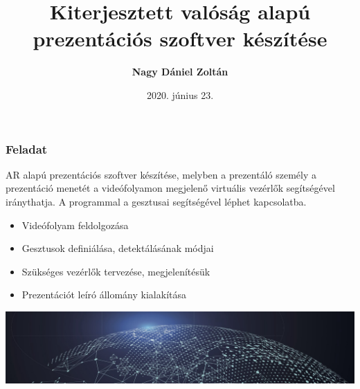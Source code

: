 \documentclass{beamer}
\title[Szakdolgozat]{\Huge Kiterjesztett valóság alapú prezentációs szoftver készítése}
\author[Nagy Dániel Zoltán]{\textbf{\huge Nagy Dániel Zoltán}}
\institute[]{\Large Miskolci Egyetem}
\date{2020. június 23.}
\begin{document}

\frame{\Large \titlepage}

\begin{frame}[fragile]
\frametitle{Feladat}

AR alapú prezentációs szoftver készítése, melyben a prezentáló személy a prezentáció menetét a videófolyamon megjelenő virtuális vezérlők segítségével iránythatja. A programmal a gesztusai segítségével léphet kapcsolatba.

\medskip
\begin{block}{}
\begin{itemize}
	\item Videófolyam feldolgozása
	\item Gesztusok definiálása, detektálásának módjai
	\item Szükséges vezérlők tervezése, megjelenítésük
	\item Prezentációt leíró állomány kialakítása
\end{itemize}
\end{block}

\medskip

\includegraphics[width=\textwidth]{images/globe.png}

\end{frame}
\end{document}
